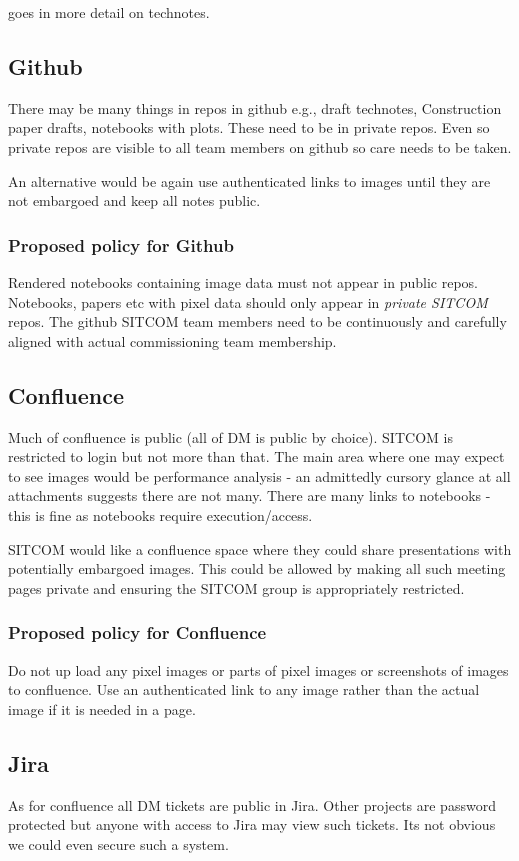  goes in more detail on technotes.


\subsection{Github }
There may be many things in repos in github e.g., draft technotes, Construction paper drafts, notebooks with plots.
These need to be in private repos.
Even so private repos are visible to all team members on github so care needs to be taken.

An alternative would be again use authenticated links to images until they are not embargoed and keep all notes public.

\subsubsection{Proposed policy for Github}
Rendered notebooks containing image data must not appear in public repos.
Notebooks, papers etc with pixel data should only appear in \emph{private SITCOM} repos.
The github SITCOM team members need to be continuously and carefully aligned with actual commissioning team membership.

\subsection{Confluence}
Much of confluence is public (all of DM is public by choice).
SITCOM is restricted to login but not more than that.
The main area where one may expect to see images would be performance analysis - an admittedly  cursory glance at all attachments suggests there are not many.
There are many links to notebooks - this is fine as notebooks require execution/access.

SITCOM would like a confluence space where they could share presentations with potentially embargoed images.
This could be allowed by making all such meeting pages private and ensuring the SITCOM group is appropriately restricted.

\subsubsection{Proposed policy for Confluence}
Do not up load any pixel images or parts of pixel images or screenshots of images to confluence.
Use an authenticated link to any image rather than the actual image if it is needed in a page.




\subsection{Jira}
As for confluence all DM tickets are public in Jira.
Other projects are password protected but anyone with access to Jira may view such tickets.
Its not obvious we could even secure such a system.

